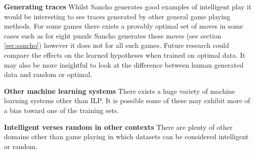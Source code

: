 \textbf{Generating traces} Whilst Sancho generates good examples of intelligent play it would be interesting to see traces generated by other general game playing methods\cite{Park/GGPAdvances,Kowalski/GGP}. For some games there exists a provably optimal set of moves in some cases such as for eight puzzle Sancho generates these moves (see section \ref{sec:sancho}) however it does not for all such games\cite{Schaeffer/Checkers}. Future research could compare the effects on the learned hypotheses when trained on optimal data. It may also be more insightful to look at the difference between human generated data and random or optimal.

\textbf{Other machine learning systems} There exists a huge variety of machine learning systems other than ILP. It is possible some of these may exhibit more of a bias toward one of the training sets. 

\textbf{Intelligent verses random in other contexts} There are plenty of other domains other than game playing in which datasets can be considered intelligent or random.


